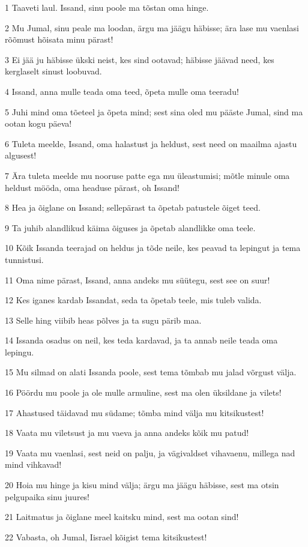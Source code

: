 \par 1 Taaveti laul. Issand, sinu poole ma tõstan oma hinge.
\par 2 Mu Jumal, sinu peale ma loodan, ärgu ma jäägu häbisse; ära lase mu vaenlasi rõõmust hõisata minu pärast!
\par 3 Ei jää ju häbisse ükski neist, kes sind ootavad; häbisse jäävad need, kes kerglaselt sinust loobuvad.
\par 4 Issand, anna mulle teada oma teed, õpeta mulle oma teeradu!
\par 5 Juhi mind oma tõeteel ja õpeta mind; sest sina oled mu pääste Jumal, sind ma ootan kogu päeva!
\par 6 Tuleta meelde, Issand, oma halastust ja heldust, sest need on maailma ajastu algusest!
\par 7 Ära tuleta meelde mu nooruse patte ega mu üleastumisi; mõtle minule oma heldust mööda, oma headuse pärast, oh Issand!
\par 8 Hea ja õiglane on Issand; sellepärast ta õpetab patustele õiget teed.
\par 9 Ta juhib alandlikud käima õiguses ja õpetab alandlikke oma teele.
\par 10 Kõik Issanda teerajad on heldus ja tõde neile, kes peavad ta lepingut ja tema tunnistusi.
\par 11 Oma nime pärast, Issand, anna andeks mu süütegu, sest see on suur!
\par 12 Kes iganes kardab Issandat, seda ta õpetab teele, mis tuleb valida.
\par 13 Selle hing viibib heas põlves ja ta sugu pärib maa.
\par 14 Issanda osadus on neil, kes teda kardavad, ja ta annab neile teada oma lepingu.
\par 15 Mu silmad on alati Issanda poole, sest tema tõmbab mu jalad võrgust välja.
\par 16 Pöördu mu poole ja ole mulle armuline, sest ma olen üksildane ja vilets!
\par 17 Ahastused täidavad mu südame; tõmba mind välja mu kitsikustest!
\par 18 Vaata mu viletsust ja mu vaeva ja anna andeks kõik mu patud!
\par 19 Vaata mu vaenlasi, sest neid on palju, ja vägivaldset vihavaenu, millega nad mind vihkavad!
\par 20 Hoia mu hinge ja kisu mind välja; ärgu ma jäägu häbisse, sest ma otsin pelgupaika sinu juures!
\par 21 Laitmatus ja õiglane meel kaitsku mind, sest ma ootan sind!
\par 22 Vabasta, oh Jumal, Iisrael kõigist tema kitsikustest!


